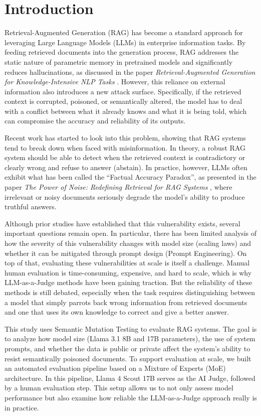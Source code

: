 \section{Introduction}
\label{intro}
Retrieval-Augmented Generation (RAG) has become a standard approach for leveraging Large Language Models (LLMs) in enterprise information tasks. By feeding retrieved documents into the generation process, RAG addresses the static nature of parametric memory in pretrained models and significantly reduces hallucinations, as discussed in the paper \textit{Retrieval-Augmented Generation for Knowledge-Intensive NLP Tasks} \cite{lewis2020retrieval}. However, this reliance on external information also introduces a new attack surface. Specifically, if the retrieved context is corrupted, poisoned, or semantically altered, the model has to deal with a conflict between what it already knows and what it is being told, which can compromise the accuracy and reliability of its outputs.

Recent work has started to look into this problem, showing that RAG systems tend to break down when faced with misinformation. In theory, a robust RAG system should be able to detect when the retrieved context is contradictory or clearly wrong and refuse to answer (abstain). In practice, however, LLMs often exhibit what has been called the ``Factual Accuracy Paradox'', as presented in the paper \textit{The Power of Noise: Redefining Retrieval for RAG Systems} \cite{cuconasu2024power}, where irrelevant or noisy documents seriously degrade the model's ability to produce truthful answers.

Although prior studies have established that this vulnerability exists, several important questions remain open. In particular, there has been limited analysis of how the severity of this vulnerability changes with model size (scaling laws) and whether it can be mitigated through prompt design (Prompt Engineering). On top of that, evaluating these vulnerabilities at scale is itself a challenge. Manual human evaluation is time-consuming, expensive, and hard to scale, which is why LLM-as-a-Judge methods have been gaining traction. But the reliability of these methods is still debated, especially when the task requires distinguishing between a model that simply parrots back wrong information from retrieved documents and one that uses its own knowledge to correct and give a better answer.

This study uses Semantic Mutation Testing to evaluate RAG systems. The goal is to analyze how model size (Llama 3.1 8B and 17B parameters), the use of system prompts, and whether the data is public or private affect the system's ability to resist semantically poisoned documents. To support evaluation at scale, we built an automated evaluation pipeline based on a Mixture of Experts (MoE) architecture. In this pipeline, Llama 4 Scout 17B serves as the AI Judge, followed by a human evaluation step. This setup allows us to not only assess model performance but also examine how reliable the LLM-as-a-Judge approach really is in practice.
